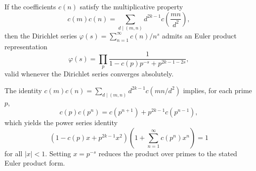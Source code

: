 If the coefficients $c(n)$ satisfy the multiplicative property
$$c(m)c(n) = \sum_{d \mid (m,n)} d^{2k-1} c\!\left(\frac{mn}{d^2}\right),$$
then the Dirichlet series $\varphi(s) = \sum_{n=1}^{\infty} c(n)/n^s$ admits an Euler product representation
$$\varphi(s) = \prod_p \frac{1}{1 - c(p)p^{-s} + p^{2k-1-2s}},$$
valid whenever the Dirichlet series converges absolutely.

The identity $c(m)c(n) = \sum_{d \mid (m,n)} d^{2k-1} c(mn/d^2)$ implies, for each prime $p$,
$$c(p)c(p^n) = c(p^{n+1}) + p^{2k-1} c(p^{n-1}),$$
which yields the power series identity
$$(1 - c(p)x + p^{2k-1}x^2)\left(1 + \sum_{n=1}^{\infty} c(p^n)x^n\right) = 1$$
for all $|x| < 1$. Setting $x = p^{-s}$ reduces the product over primes to the stated Euler product form.
